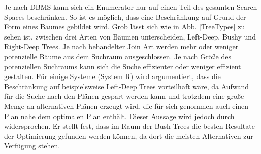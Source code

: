 Je nach \ac{DBMS} kann sich ein Enumerator nur auf einen Teil des gesamten Search Spaces beschränken. So ist es möglich, dass eine Beschränkung auf Grund der Form eines Baumes gebildet wird. Grob lässt sich wie in Abb. \ref{TreeTypes} zu sehen ist, zwischen drei Arten von Bäumen unterscheiden, Left-Deep, Bushy und Right-Deep Trees. Je nach behandelter Join Art werden mehr oder weniger potenzielle Bäume aus dem Suchraum ausgeschlossen. Je nach Größe des potenziellen Suchraums kann sich die Suche effizienter oder weniger effizient gestalten. Für einige Systeme (System R) wird argumentiert, dass die Beschränkung auf beispielsweise Left-Deep Trees vorteilhaft wäre, da Aufwand für die Suche nach den Plänen gespart werden kann und trotzdem eine große Menge an alternativen Plänen erzeugt wird, die für sich genommen auch einen Plan nahe dem optimalen Plan enthält. Dieser Aussage wird jedoch durch \cite{ioannidis1991left} widersprochen. Er stellt fest, dass im Raum der Bush-Trees die besten Resultate der Optimierung gefunden werden können, da dort die meisten Alternativen zur Verfügung stehen. 